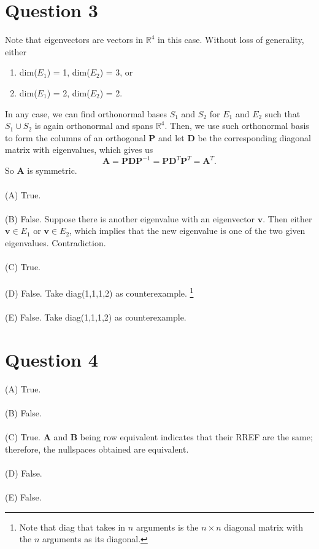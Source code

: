 \documentclass{article}
\begin{document}
\section*{Question 3}
Note that eigenvectors are vectors in $\mathbb{R}^4$ in this case. Without loss of generality, either 
\begin{enumerate}
  \item  dim($E_1$) = 1, dim($E_2$) = 3, or

  \item  dim($E_1$) = 2, dim($E_2$) = 2.
\end{enumerate}
In any case, we can find orthonormal bases $S_1$ and $S_2$ for $E_1$ and $E_2$ such that $S_1 \cup S_2$ is again orthonormal and spans $\mathbb{R}^4$. Then, we use such orthonormal basis to form the columns of an orthogonal $\mathbf{P}$ and let $\mathbf{D}$ be the corresponding diagonal matrix with eigenvalues, which gives us 
\[\mathbf{A} = \mathbf{P}\mathbf{D}\mathbf{P}^{-1} = \mathbf{P}\mathbf{D}^{T}\mathbf{P}^{T} = \mathbf{A}^{T}.\]
So $\mathbf{A}$ is symmetric. \\\\
(A) True. \\\\
(B) False. Suppose there is another eigenvalue with an eigenvector $\mathbf{v}$. Then either $\mathbf{v} \in E_1$ or $\mathbf{v} \in E_2$, which implies that the new eigenvalue is one of the two given eigenvalues. Contradiction. \\\\
(C) True. \\\\
(D) False. Take diag(1,1,1,2) as counterexample. \footnote{Note that diag that takes in $n$ arguments is the $n \times n$ diagonal matrix with the $n$ arguments as its diagonal.} \\\\
(E) False. Take diag(1,1,1,2) as counterexample.
\section*{Question 4}
(A) True. \\\\
(B) False. \\\\
(C) True. $\mathbf{A}$ and $\mathbf{B}$ being row equivalent indicates that their RREF are the same; therefore, the nullspaces obtained are equivalent.  \\\\
(D) False.\\\\
(E) False.
\end{document}
